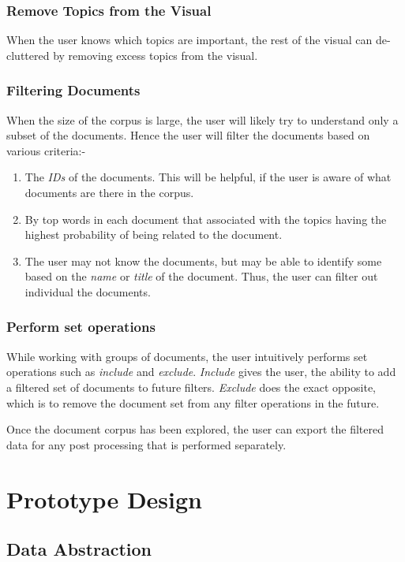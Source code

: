 \documentclass[10pt,journal,compsoc]{IEEEtran}
\begin{document}
\subsubsection{Remove Topics from the Visual}
When the user knows which topics are important, the rest of the visual can de-cluttered by removing excess topics from the visual.

\subsubsection{Filtering Documents}
When the size of the corpus is large, the user will likely try to understand only a subset of the documents. Hence the user will filter the documents based on various criteria:-
\begin{enumerate}
\item The \textit{IDs} of the documents. This will be helpful, if the user is aware of what documents are there in the corpus.
\item By top words in each document that associated with the topics having the highest probability of being related to the document.
\item The user may not know the documents, but may be able to identify some based on the \textit{name} or \textit{title} of the document. Thus, the user can filter out individual the documents.
\end{enumerate}

\subsubsection{Perform set operations}
While working with groups of documents, the user intuitively performs set operations such as \textit{include} and \textit{exclude}. \textit{Include} gives the user, the ability to add a filtered set of documents to future filters. \textit{Exclude} does the exact opposite, which is to remove the document set from any filter operations in the future.

Once the document corpus has been explored, the user can export the filtered data for any post processing that is performed separately.

\section{Prototype Design}
\subsection{Data Abstraction}
\end{document}
